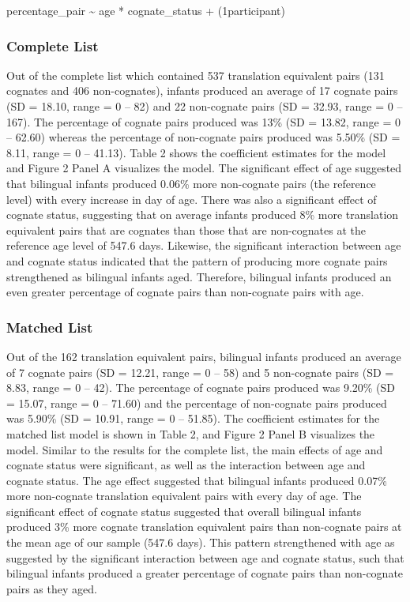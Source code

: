 \documentclass[
  english,
  ,man,floatsintext]{apa6}
\begin{document}
percentage\_pair \textasciitilde{} age * cognate\_status + (1\textbar participant)

\hypertarget{complete-list-1}{%
\subsubsection{Complete List}\label{complete-list-1}}

Out of the complete list which contained 537 translation equivalent pairs (131 cognates and 406 non-cognates), infants produced an average of 17 cognate pairs (SD = 18.10, range = 0 -- 82) and 22 non-cognate pairs (SD = 32.93, range = 0 -- 167). The percentage of cognate pairs produced was 13\% (SD = 13.82, range = 0 -- 62.60) whereas the percentage of non-cognate pairs produced was 5.50\% (SD = 8.11, range = 0 -- 41.13). Table 2 shows the coefficient estimates for the model and Figure 2 Panel A visualizes the model. The significant effect of age suggested that bilingual infants produced 0.06\% more non-cognate pairs (the reference level) with every increase in day of age. There was also a significant effect of cognate status, suggesting that on average infants produced 8\% more translation equivalent pairs that are cognates than those that are non-cognates at the reference age level of 547.6 days. Likewise, the significant interaction between age and cognate status indicated that the pattern of producing more cognate pairs strengthened as bilingual infants aged. Therefore, bilingual infants produced an even greater percentage of cognate pairs than non-cognate pairs with age.

\hypertarget{matched-list-1}{%
\subsubsection{Matched List}\label{matched-list-1}}

Out of the 162 translation equivalent pairs, bilingual infants produced an average of 7 cognate pairs (SD = 12.21, range = 0 -- 58) and 5 non-cognate pairs (SD = 8.83, range = 0 -- 42). The percentage of cognate pairs produced was 9.20\% (SD = 15.07, range = 0 -- 71.60) and the percentage of non-cognate pairs produced was 5.90\% (SD = 10.91, range = 0 -- 51.85). The coefficient estimates for the matched list model is shown in Table 2, and Figure 2 Panel B visualizes the model. Similar to the results for the complete list, the main effects of age and cognate status were significant, as well as the interaction between age and cognate status. The age effect suggested that bilingual infants produced 0.07\% more non-cognate translation equivalent pairs with every day of age. The significant effect of cognate status suggested that overall bilingual infants produced 3\% more cognate translation equivalent pairs than non-cognate pairs at the mean age of our sample (547.6 days). This pattern strengthened with age as suggested by the significant interaction between age and cognate status, such that bilingual infants produced a greater percentage of cognate pairs than non-cognate pairs as they aged.
\end{document}
